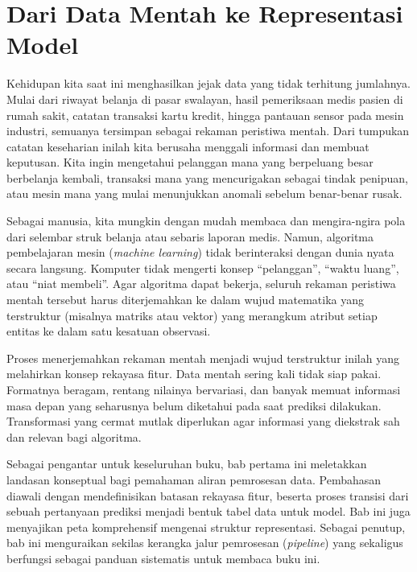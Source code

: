 \chapter{Dari Data Mentah ke Representasi Model}\label{dari-data-mentah-ke-representasi-model}

Kehidupan kita saat ini menghasilkan jejak data yang tidak terhitung jumlahnya. Mulai dari riwayat belanja di pasar swalayan, hasil pemeriksaan medis pasien di rumah sakit, catatan transaksi kartu kredit, hingga pantauan sensor pada mesin industri, semuanya tersimpan sebagai rekaman peristiwa mentah. Dari tumpukan catatan keseharian inilah kita berusaha menggali informasi dan membuat keputusan. Kita ingin mengetahui pelanggan mana yang berpeluang besar berbelanja kembali, transaksi mana yang mencurigakan sebagai tindak penipuan, atau mesin mana yang mulai menunjukkan anomali sebelum benar-benar rusak.

Sebagai manusia, kita mungkin dengan mudah membaca dan mengira-ngira pola dari selembar struk belanja atau sebaris laporan medis. Namun, algoritma pembelajaran mesin (\emph{machine learning}) tidak berinteraksi dengan dunia nyata secara langsung. Komputer tidak mengerti konsep ``pelanggan'', ``waktu luang'', atau ``niat membeli''. Agar algoritma dapat bekerja, seluruh rekaman peristiwa mentah tersebut harus diterjemahkan ke dalam wujud matematika yang terstruktur (misalnya matriks atau vektor) yang merangkum atribut setiap entitas ke dalam satu kesatuan observasi.

Proses menerjemahkan rekaman mentah menjadi wujud terstruktur inilah yang melahirkan konsep rekayasa fitur. Data mentah sering kali tidak siap pakai. Formatnya beragam, rentang nilainya bervariasi, dan banyak memuat informasi masa depan yang seharusnya belum diketahui pada saat prediksi dilakukan. Transformasi yang cermat mutlak diperlukan agar informasi yang diekstrak sah dan relevan bagi algoritma.

Sebagai pengantar untuk keseluruhan buku, bab pertama ini meletakkan landasan konseptual bagi pemahaman aliran pemrosesan data. Pembahasan diawali dengan mendefinisikan batasan rekayasa fitur, beserta proses transisi dari sebuah pertanyaan prediksi menjadi bentuk tabel data untuk model. Bab ini juga menyajikan peta komprehensif mengenai struktur representasi. Sebagai penutup, bab ini menguraikan sekilas kerangka jalur pemrosesan (\emph{pipeline}) yang sekaligus berfungsi sebagai panduan sistematis untuk membaca buku ini.

